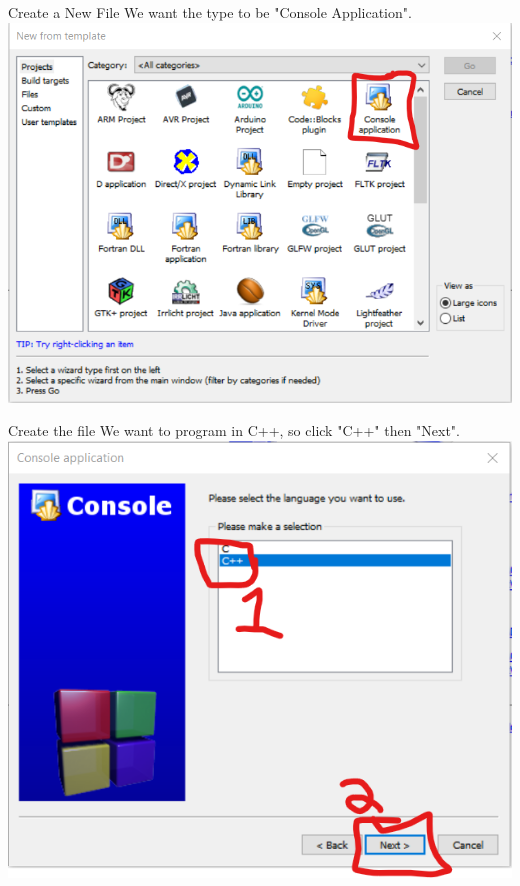 \documentclass{beamer}
\begin{document}
\begin{frame}{Create a New File}
    We want the type to be "Console Application".
    \includegraphics[scale=.5]{codeblockssetup2.png}
\end{frame}

\begin{frame}{Create the file}
     We want to program in C++, so click "C++" then "Next".
     \includegraphics[scale=.6]{codeblockssetup25.png}
    
\end{frame}
\end{document}

